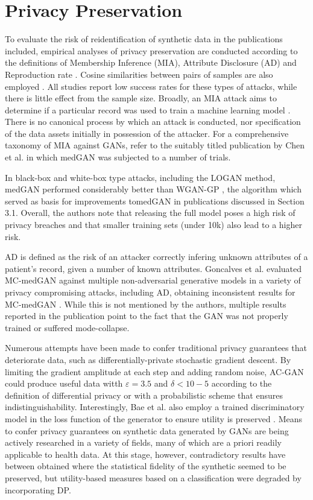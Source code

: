\section{Privacy Preservation}
To evaluate the risk of reidentification of synthetic data in the publications included, empirical analyses of privacy preservation are conducted according to the definitions of Membership Inference (MIA), Attribute Disclosure (AD)  \cite{choi2017generating,Goncalves2020,yan2020generating} and Reproduction rate \cite{Zhang2020-wp}. Cosine similarities between pairs of samples are also employed \cite{torfi2019generating}. All studies report low success rates for these types of attacks, while there is little effect from the sample size. Broadly, an MIA attack aims to determine if a particular record was used to train a machine learning model \cite{chen2019ganleaks}. There is no canonical process by which an attack is conducted, nor specification of the data assets initially in possession of the attacker. For a comprehensive taxonomy of MIA against GANs, refer to the suitably titled publication by Chen et al. in which medGAN was subjected to a number of trials.\par
In black-box and white-box type attacks, including the LOGAN \cite{hayes2017logan} method, medGAN performed considerably better than WGAN-GP \cite{gulrajani2017improved}, the algorithm which served as basis for improvements tomedGAN in publications discussed in Section 3.1. Overall, the authors note that releasing the full model poses a high risk of privacy breaches and that smaller training sets (under 10k) also lead to a higher risk.\par  
AD is defined as the risk of an attacker correctly infering unknown attributes of a patient's record, given a number of known attributes. Goncalves et al. evaluated MC-medGAN against multiple non-adversarial generative models in a variety of privacy compromising attacks, including AD, obtaining inconsistent results for MC-medGAN \cite{Goncalves2020}. While this is not mentioned by the authors, multiple results reported in the publication point to the fact that the GAN was not properly trained or suffered mode-collapse.\par
Numerous attempts have been made to confer traditional privacy guarantees that deteriorate data, such as differentially-private stochastic gradient descent. By limiting the gradient amplitude at each step and adding random noise, AC-GAN could produce useful data witth $ε=3.5$ and $δ<10−5$ according to the definition of differential privacy \cite{Beaulieu-Jones2019-ct, esteban2017real,chincheong2020generation} or with a probabilistic scheme that ensures indistinguishability. Interestingly, Bae et al. also employ a trained discriminatory model in the loss function of the generator to ensure utility is preserved \cite{Bae2020}. Means to confer privacy guarantees on synthetic data generated by GANs are being actively researched in a variety of fields, many of which are a priori readily applicable to health data. At this stage, however, contradictory results have between obtained where the statistical fidelity of the synthetic seemed to be preserved, but utility-based measures based on a classification were degraded by incorporating DP.\par
